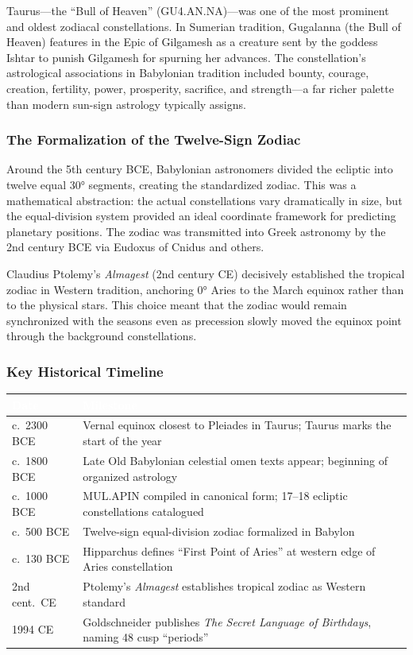 \documentclass[11pt,letterpaper]{article}
\newcommand{\tableheader}[1]{\textbf{\sffamily\textcolor{white}{#1}}}
\begin{document}
Taurus---the ``Bull of Heaven'' (GU4.AN.NA)---was one of the most prominent and oldest zodiacal constellations. In Sumerian tradition, Gugalanna (the Bull of Heaven) features in the Epic of Gilgamesh as a creature sent by the goddess Ishtar to punish Gilgamesh for spurning her advances. The constellation's astrological associations in Babylonian tradition included bounty, courage, creation, fertility, power, prosperity, sacrifice, and strength---a far richer palette than modern sun-sign astrology typically assigns.

\subsubsection{The Formalization of the Twelve-Sign Zodiac}

Around the 5th century BCE, Babylonian astronomers divided the ecliptic into twelve equal 30° segments, creating the standardized zodiac. This was a mathematical abstraction: the actual constellations vary dramatically in size, but the equal-division system provided an ideal coordinate framework for predicting planetary positions. The zodiac was transmitted into Greek astronomy by the 2nd century BCE via Eudoxus of Cnidus and others.

Claudius Ptolemy's \textit{Almagest} (2nd century CE) decisively established the tropical zodiac in Western tradition, anchoring 0° Aries to the March equinox rather than to the physical stars. This choice meant that the zodiac would remain synchronized with the seasons even as precession slowly moved the equinox point through the background constellations.

\subsubsection{Key Historical Timeline}

\begin{center}
\begin{tabularx}{\textwidth}{L{3cm}X}
\toprule
{}
\tableheader{Date} & \tableheader{Milestone} \\
\midrule
c.\ 2300 BCE & Vernal equinox closest to Pleiades in Taurus; Taurus marks the start of the year \\
c.\ 1800 BCE & Late Old Babylonian celestial omen texts appear; beginning of organized astrology \\
c.\ 1000 BCE & MUL.APIN compiled in canonical form; 17--18 ecliptic constellations catalogued \\
c.\ 500 BCE & Twelve-sign equal-division zodiac formalized in Babylon \\
c.\ 130 BCE & Hipparchus defines ``First Point of Aries'' at western edge of Aries constellation \\
2nd cent.\ CE & Ptolemy's \textit{Almagest} establishes tropical zodiac as Western standard \\
1994 CE & Goldschneider publishes \textit{The Secret Language of Birthdays}, naming 48 cusp ``periods'' \\
\bottomrule
\end{tabularx}
\end{center}
\end{document}
